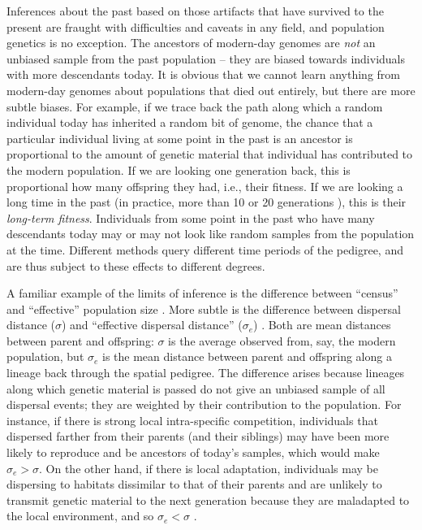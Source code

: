 \documentclass{ar-1col}
\renewcommand{\emph}[1]{{\textit{#1}}}
\begin{document}
Inferences about the past
based on those artifacts that have survived to the present
are fraught with difficulties and caveats in any field, 
and population genetics is no exception.
The ancestors of modern-day genomes are \emph{not} an unbiased sample
from the past population -- 
they are biased towards individuals with more descendants today.
It is obvious that we cannot learn anything from modern-day genomes
about populations that died out entirely, 
but there are more subtle biases.
For example, if we trace back the path along which a random individual today 
has inherited a random bit of genome,
the chance that a particular individual living at some point in the past is an ancestor
is proportional to the amount of genetic material that individual has contributed to the modern population.
If we are looking one generation back, 
this is proportional how many offspring they had, i.e., their fitness.
If we are looking a long time in the past
(in practice, more than 10 or 20 generations \citep{BartonEtheridge2011fitness}),
this is their \emph{long-term fitness}.
Individuals from some point in the past who have many descendants today
may or may not look like random samples from the population at the time.
Different methods query different time periods of the pedigree,
and are thus subject to these effects to different degrees.

A familiar example of the limits of inference 
is the difference between ``census'' and ``effective'' population size \citep{Wright_1931,Charlesworth2009}.
More subtle is the difference between dispersal distance ($\sigma$) and
``effective dispersal distance'' ($\sigma_e$) \citep[reviewed in][]{Cayuela2018demographic}.
Both are mean distances between parent and offspring:
$\sigma$ is the average observed from, say, the modern population,
but $\sigma_e$ is
the mean distance between parent and offspring along a lineage back through the spatial pedigree.
The difference arises because
lineages along which genetic material is passed do not give an unbiased sample of all dispersal events;
they are weighted by their contribution to the population.
For instance, if there is strong local intra-specific competition,
individuals that dispersed farther from their parents (and their siblings)
may have been more likely to reproduce and be ancestors of today's samples,
which would make $\sigma_e > \sigma$.
On the other hand, if there is local adaptation,
individuals may be dispersing to habitats dissimilar to that of their parents
and are unlikely to transmit genetic material to the next generation
because they are maladapted to the local environment,
and so $\sigma_e < \sigma$
\citep[for a review, see][]{wangbradburd2014}.
\end{document}
